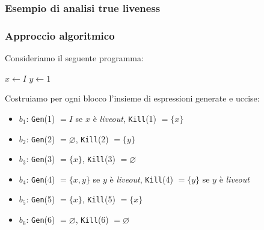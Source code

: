 \subsubsection{Esempio di analisi true liveness}
\subsubsection{Approccio algoritmico}

\begin{minipage}{0.5\textwidth}
    Consideriamo il seguente programma:

    \begin{algorithm}[H]
        $x \gets I$\;
        $y \gets 1$\;
    \end{algorithm}
    
    \end{minipage} 
    \begin{minipage}{0.5\textwidth}
    \begin{figure}[H]
        \centering
    \end{figure}
    \end{minipage}

    Costruiamo per ogni blocco l'insieme di espressioni generate e uccise:
    \begin{itemize}
        \item $b_1$: \texttt{Gen}(1) $= I$ se $x$ è \textit{liveout},
        \texttt{Kill}(1) $= \{ x \}$
        \item $b_2$: \texttt{Gen}(2) $= \varnothing$, \texttt{Kill}(2) $= \{y\}$
        \item $b_3$: \texttt{Gen}(3) $= \{x\}$, \texttt{Kill}(3) $= \varnothing$
        \item $b_4$: \texttt{Gen}(4) $= \{x,y\}$ se $y$ è \textit{liveout},
        \texttt{Kill}(4) $= \{y\}$ se $y$ è \textit{liveout}
        \item $b_5$: \texttt{Gen}(5) $= \{x\}$, \texttt{Kill}(5) $= \{x\}$
        \item $b_6$: \texttt{Gen}(6) $= \varnothing$, \texttt{Kill}(6) $= \varnothing$
    \end{itemize}

